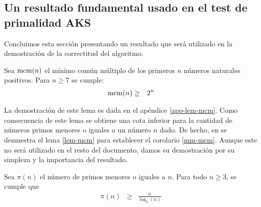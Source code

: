 \subsection{Un resultado fundamental usado en el test de primalidad AKS}
Concluimos esta sección presentando un resultado que será utilizado en
la demostración de la correctitud del algoritmo.
	\begin{lemma}[\cite{N82}]\label{lem-mcm}
		Sea ${\rm mcm}(n)$ el mí­nimo común múltiplo de los primeros $n$ números naturales positivos. Para $n \geq 7$ se cumple:
		\begin{eqnarray*}
			{\rm mcm}(n) & \geq & 2^n
		\end{eqnarray*}
	\end{lemma}
	La demostración de este lema es dada en el apéndice \ref{app-lem-mcm}. Como consecuencia de este lema se obtiene una cota inferior para la cantidad de números primos menores o iguales a un número $n$ dado. De hecho, en \cite{N82} se demuestra el lema \ref{lem-mcm} para establecer el corolario \ref{mm-mcm}. Aunque este no será utilizado en el resto del documento, damos su demostración por su simpleza y la importancia del resultado. 
	\begin{corollary}\label{mm-mcm}
	Sea $\pi(n)$ el número de primos menores o iguales a $n$. Para todo $n\geq 3$, se cumple que 
	\begin{eqnarray*}
		\pi(n) & \geq &\frac{n}{\log_2(n)}
	\end{eqnarray*}	
	\end{corollary}
